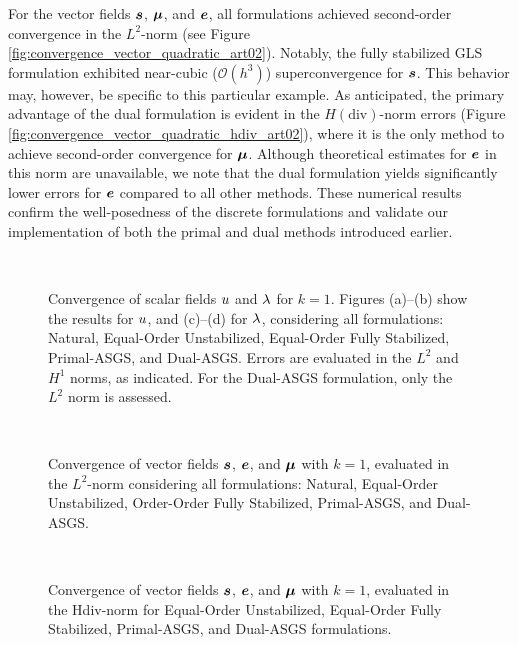 For the vector fields $\bm{s}$, $\bm{\mu}$, and $\bm{e}$, all formulations achieved second-order convergence in the $L^2$-norm (see Figure \ref{fig:convergence_vector_quadratic_art02}). Notably, the fully stabilized GLS formulation exhibited near-cubic ($\mathcal{O}(h^3)$) superconvergence for $\bm{s}$. This behavior may, however, be specific to this particular example. As anticipated, the primary advantage of the dual formulation is evident in the $H(\text{div})$-norm errors (Figure \ref{fig:convergence_vector_quadratic_hdiv_art02}), where it is the only method to achieve second-order convergence for $\bm{\mu}$. Although theoretical estimates for $\bm{e}$ in this norm are unavailable, we note that the dual formulation yields significantly lower errors for $\bm{e}$ compared to all other methods.
These numerical results confirm the well-posedness of the discrete formulations and validate our implementation of both the primal and dual methods introduced earlier.


\begin{figure}[h!]
	\centering
	\caption{Convergence of scalar fields $u$ and $\lambda$ for $k = 1$. Figures (a)--(b) show the results for $u$, and (c)--(d) for $\lambda$, considering all formulations: Natural, Equal-Order Unstabilized, Equal-Order Fully Stabilized, Primal-ASGS, and Dual-ASGS. Errors are evaluated in the $L^2$ and $H^1$ norms, as indicated. For the Dual-ASGS formulation, only the $L^2$ norm is assessed.}
		~\\
	\def\svgwidth{1.0\columnwidth}
	
	\label{fig:convergence_scalar_linear_art02}
\end{figure}


\begin{figure}[h!]
	\centering
	\caption{Convergence of vector fields $\bm{s}$, $\bm{e}$, and $\bm{\mu}$ with $k=1$, evaluated in the $L^{2}$-norm considering all formulations: Natural, Equal-Order Unstabilized, Order-Order Fully Stabilized, Primal-ASGS, and Dual-ASGS.
	}
	~\\
	\def\svgwidth{1.0\columnwidth}
	
	\label{fig:convergence_vector_linear_art02}
\end{figure}


\begin{figure}[h!]
	\centering
	\caption{Convergence of vector fields $\bm{s}$, $\bm{e}$, and $\bm{\mu}$ with $k=1$, evaluated in the Hdiv-norm for Equal-Order Unstabilized, Equal-Order Fully Stabilized, Primal-ASGS, and Dual-ASGS formulations.
	}
	~\\
	\def\svgwidth{1.0\columnwidth}
	
	\label{fig:convergence_vector_linear_hdiv_art02}
\end{figure}


